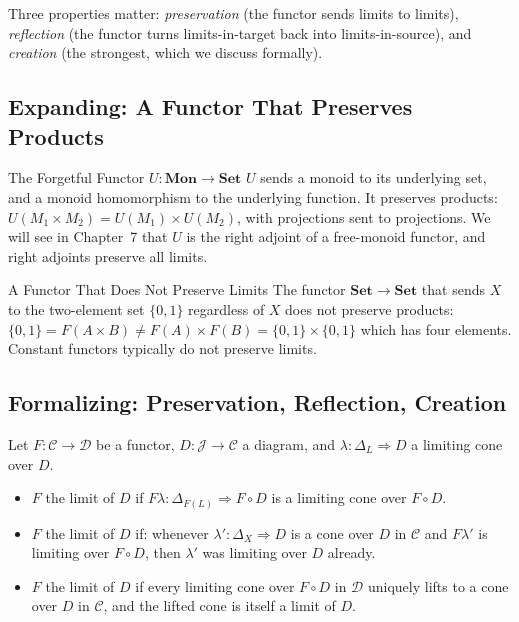 Three properties matter: \emph{preservation} (the functor sends limits to
limits), \emph{reflection} (the functor turns limits-in-target back into
limits-in-source), and \emph{creation} (the strongest, which we discuss
formally).

\subsection{Expanding: A Functor That Preserves Products}

\begin{example}{The Forgetful Functor $U : \mathbf{Mon} \to \mathbf{Set}$}
$U$ sends a monoid to its underlying set, and a monoid homomorphism to
the underlying function. It preserves products: $U(M_1 \times M_2) =
U(M_1) \times U(M_2)$, with projections sent to projections. We will see
in Chapter~7 that $U$ is the right adjoint of a free-monoid functor, and
right adjoints preserve all limits.
\end{example}

\begin{example}{A Functor That Does Not Preserve Limits}
The functor $\mathbf{Set} \to \mathbf{Set}$ that sends $X$ to the
two-element set $\{0, 1\}$ regardless of $X$ does not preserve products:
$\{0,1\} = F(A \times B) \neq F(A) \times F(B) = \{0,1\} \times \{0,1\}$
which has four elements. Constant functors typically do not preserve
limits.
\end{example}

\subsection{Formalizing: Preservation, Reflection, Creation}

Let $F : \mathcal{C} \to \mathcal{D}$ be a functor, $D : \mathcal{J} \to
\mathcal{C}$ a diagram, and $\lambda : \Delta_L \Rightarrow D$ a limiting
cone over $D$.

\begin{itemize}
  \item $F$  the limit of $D$ if $F \lambda :
        \Delta_{F(L)} \Rightarrow F \circ D$ is a limiting cone over
        $F \circ D$.
  \item $F$  the limit of $D$ if: whenever
        $\lambda' : \Delta_X \Rightarrow D$ is a cone over $D$ in
        $\mathcal{C}$ and $F \lambda'$ is limiting over $F \circ D$,
        then $\lambda'$ was limiting over $D$ already.
  \item $F$  the limit of $D$ if every limiting cone over
        $F \circ D$ in $\mathcal{D}$ uniquely lifts to a cone over $D$
        in $\mathcal{C}$, and the lifted cone is itself a limit of $D$.
\end{itemize}

